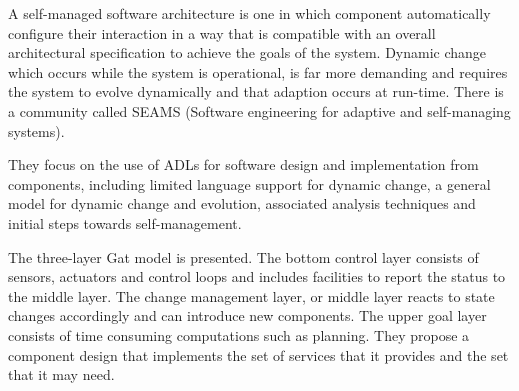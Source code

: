 
A self-managed software architecture is one in which component automatically configure their interaction in a way that is compatible with an overall architectural specification to achieve the goals of the system. Dynamic change which occurs while the system is operational, is far more demanding and requires the system to evolve dynamically and that adaption occurs at run-time. There is a community called SEAMS (Software engineering for adaptive and self-managing systems).

They focus on the use of ADLs for software design and implementation from components, including limited language support for dynamic change, a general model for dynamic change and evolution, associated analysis techniques and initial steps towards self-management.

The three-layer Gat model is presented. The bottom control layer consists of sensors, actuators and control loops and includes facilities to report the status to the middle layer. The change management layer, or middle layer reacts to state changes accordingly and can introduce new components. The upper goal layer consists of time consuming computations such as planning. They propose a component design that implements the set of services that it provides and the set that it may need.


